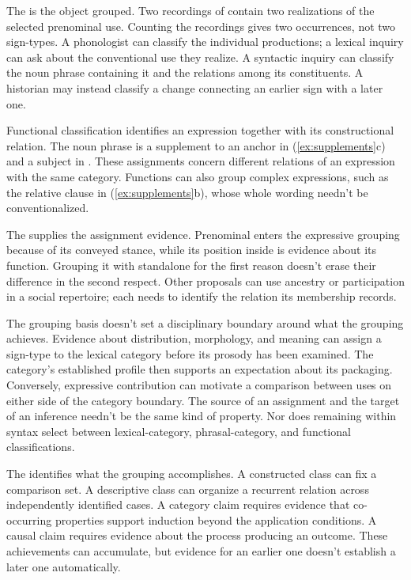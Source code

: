 \documentclass[12pt]{article}
\begin{document}
The  is the object grouped. Two recordings of  contain two realizations of the selected prenominal
 use. Counting the recordings gives two occurrences, not
two sign-types. A phonologist can classify the individual productions;
a lexical inquiry can ask about the conventional use they realize.
A syntactic inquiry can classify the noun phrase containing it and
the relations among its constituents. A historian may instead classify
a change connecting an earlier sign with a later one.

Functional classification identifies an expression together with its
constructional relation. The noun phrase  is a
supplement to an anchor in (\ref{ex:supplements}c) and a subject in
. These assignments
concern different relations of an expression with the same category.
Functions can also group complex expressions, such as the relative
clause in (\ref{ex:supplements}b), whose whole wording needn't be conventionalized.

The  supplies the assignment evidence. Prenominal
 enters the expressive grouping because of its conveyed
stance, while its position inside  is evidence
about its function. Grouping it with standalone  for
the first reason doesn't erase their difference in the second respect.
Other proposals can use ancestry or participation in a social repertoire;
each needs to identify the relation its membership records.

The grouping basis doesn't set a disciplinary boundary around what the
grouping achieves. Evidence about distribution, morphology, and meaning
can assign a sign-type to the lexical category before its prosody has been
examined.
The category's established profile then supports an expectation about
its packaging. Conversely, expressive contribution can motivate a
comparison between  uses on either side of the category
boundary. The source of an assignment and the target of an inference
needn't be the same kind of property. Nor does
remaining within syntax select between lexical-category, phrasal-category,
and functional classifications.

The  identifies what the grouping accomplishes. A
constructed class can fix a comparison set. A descriptive class can
organize a recurrent relation across independently identified cases.
A category claim requires evidence that co-occurring properties support
induction beyond the application conditions. A causal claim requires
evidence about the process producing an outcome. These achievements
can accumulate, but evidence for an earlier one doesn't establish a
later one automatically.
\end{document}
